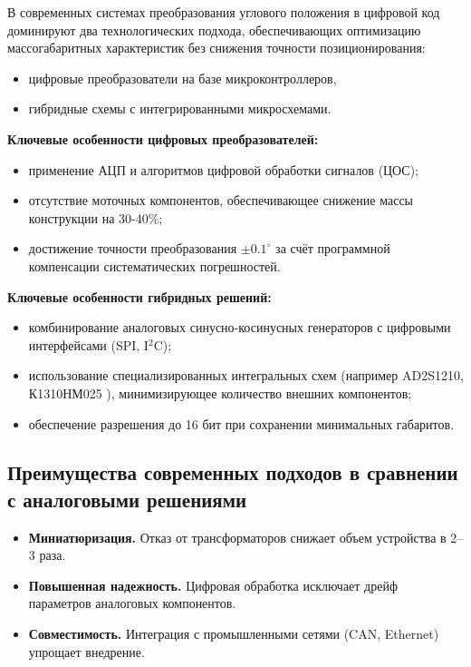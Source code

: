 В современных системах преобразования углового положения в цифровой код доминируют два технологических подхода, обеспечивающих оптимизацию массогабаритных характеристик без снижения точности позиционирования:
\begin{itemize}
    \item цифровые преобразователи на базе микроконтроллеров,
    \item гибридные схемы с интегрированными микросхемами.
\end{itemize}

\textbf{Ключевые особенности цифровых преобразователей:}
\begin{itemize}
    \item применение АЦП и алгоритмов цифровой обработки сигналов (ЦОС);
    \item отсутствие моточных компонентов, обеспечивающее снижение массы конструкции на 30-40\%;
    \item достижение точности преобразования $\pm 0.1^\circ$ за счёт программной компенсации систематических погрешностей.
\end{itemize}

\textbf{Ключевые особенности гибридных решений:}
\begin{itemize}
    \item комбинирование аналоговых синусно-косинусных генераторов с цифровыми интерфейсами (SPI, I$^2$C);
    \item использование специализированных интегральных схем (например \newline AD2S1210, К1310НМ025 \cite{Spec}), минимизирующее количество внешних компонентов;
    \item обеспечение разрешения до 16 бит при сохранении минимальных габаритов.
\end{itemize}

\subsection{Преимущества современных подходов в сравнении с аналоговыми решениями}
\begin{itemize}
    \item \textbf{Миниатюризация.} Отказ от трансформаторов снижает объем устройства в 2–3 раза.
    \item \textbf{Повышенная надежность.} Цифровая обработка исключает дрейф параметров аналоговых компонентов.
    \item \textbf{Совместимость.} Интеграция с промышленными сетями (CAN, Ethernet) упрощает внедрение.
\end{itemize}

